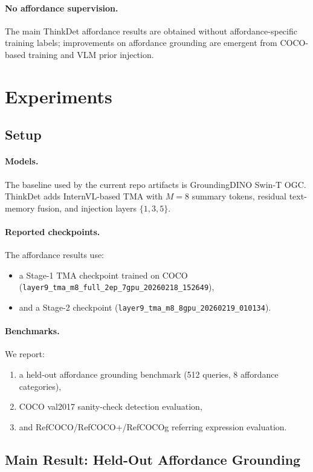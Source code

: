 \documentclass{uai2026} %
\begin{document}
\paragraph{No affordance supervision.}
The main ThinkDet affordance results are obtained without affordance-specific training labels; improvements on affordance grounding are emergent from COCO-based training and VLM prior injection.

\section{Experiments}\label{sec:experiments}
\subsection{Setup}
\paragraph{Models.}
The baseline used by the current repo artifacts is GroundingDINO Swin-T OGC.
ThinkDet adds InternVL-based TMA with \(M=8\) summary tokens, residual
text-memory fusion, and injection layers \(\{1,3,5\}\).

\paragraph{Reported checkpoints.}
The affordance results use:
\begin{itemize}
\item a Stage-1 TMA checkpoint trained on COCO (\texttt{layer9\_tma\_m8\_full\_2ep\_7gpu\_20260218\_152649}),
\item and a Stage-2 checkpoint (\texttt{layer9\_tma\_m8\_8gpu\_20260219\_010134}).
\end{itemize}

\paragraph{Benchmarks.}
We report:
\begin{enumerate}
\item a held-out affordance grounding benchmark (512 queries, 8 affordance categories),
\item COCO val2017 sanity-check detection evaluation,
\item and RefCOCO/RefCOCO+/RefCOCOg referring expression evaluation.
\end{enumerate}

\subsection{Main Result: Held-Out Affordance Grounding}\label{sec:aff-main}
\end{document}
